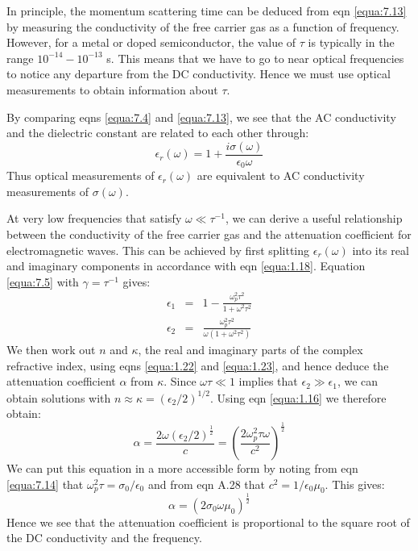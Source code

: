 \documentclass[12pt]{book}
\begin{document}
{In principle, the momentum scattering time can be deduced from eqn \ref{equa:7.13} by measuring the conductivity of the free carrier gas as a function of frequency. However, for a metal or doped semiconductor, the value of $\tau$ is typically in the range $10^{-14}-10^{-13}$ s. This means that we have to go to near optical frequencies to notice any departure from the DC conductivity. Hence we must use optical measurements to obtain information about $\tau$.

By comparing eqns \ref{equa:7.4} and \ref{equa:7.13}, we see that the AC conductivity and the dielectric constant are related to each other through:
\begin{equation}\label{equa:7.15}
  \epsilon_r(\omega)=1+\frac{i\sigma(\omega)}{\epsilon_0\omega}
\end{equation}
Thus optical measurements of $\epsilon_r(\omega)$ are equivalent to AC conductivity measurements of $\sigma(\omega)$.

At very low frequencies that satisfy $\omega\ll\tau^{-1}$, we can derive a useful relationship between the conductivity of the free carrier gas and the attenuation coefficient for electromagnetic waves. This can be achieved by first splitting $\epsilon_r(\omega)$ into its real and imaginary components in accordance with eqn \ref{equa:1.18}. Equation \ref{equa:7.5} with $\gamma=\tau^{-1}$ gives:
\begin{eqnarray}
  \epsilon_1 &=& 1-\frac{\omega_p^2\tau^2}{1+\omega^2\tau^2} \label{equa:7.16} \\
  \epsilon_2 &=& \frac{\omega_p^2\tau^2}{\omega(1+\omega^2\tau^2)} \label{equa:7.17}
\end{eqnarray}
We then work out $n$ and $\kappa$, the real and imaginary parts of the complex refractive index, using eqns \ref{equa:1.22} and \ref{equa:1.23}, and hence deduce the attenuation coefficient $\alpha$ from $\kappa$. Since $\omega\tau\ll 1$ implies that $\epsilon_2\gg\epsilon_1$, we can obtain solutions with $n\approx\kappa=(\epsilon_2/2)^{1/2}$. Using eqn \ref{equa:1.16} we therefore obtain:
\begin{equation}\label{equa:7.18}
  \alpha=\frac{2\omega(\epsilon_2/2)^{\frac{1}{2}}}{c}=\left(\frac{2\omega_p^2\tau\omega}{c^2}\right)^{\frac{1}{2}}
\end{equation}
We can put this equation in a more accessible form by noting from eqn \ref{equa:7.14} that $\omega_p^2\tau=\sigma_0/\epsilon_0$ and from eqn A.28 that $c^2=1/{\epsilon_0\mu_0}$. This gives:
\begin{equation}\label{equa:7.19}
  \alpha=(2\sigma_0\omega\mu_0)^{\frac{1}{2}}
\end{equation}
Hence we see that the attenuation coefficient is proportional to the square root of the DC conductivity and the frequency.

}
\end{document}
